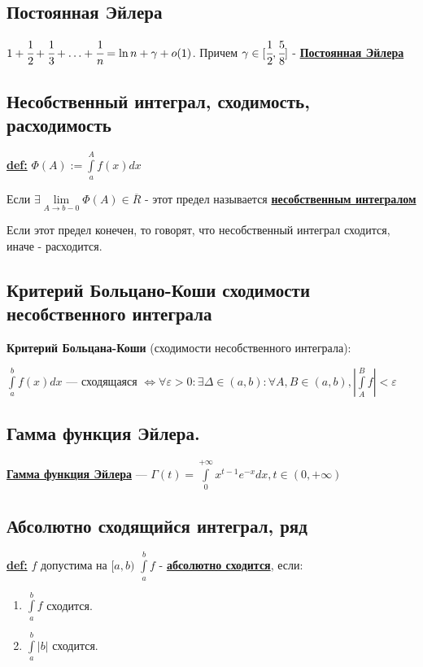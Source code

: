 \documentclass{article}
\newcommand{\integral}[2]{\displaystyle\int\limits_{#1}^{#2}}
\newcommand{\deff}[1]{\underline{\textbf{#1}}}
\begin{document}
\subsection{Постоянная Эйлера}

$1+\cfrac{1}{2}+\cfrac{1}{3}+\ldots +\cfrac{1}{n}= \ln n + \gamma + o(1)$. Причем $\gamma \in [\cfrac{1}{2},\cfrac{5}{8}]$ - \deff{Постоянная Эйлера}

\subsection{Несобственный интеграл, сходимость, расходимость}

\deff{def:} $\varPhi(A):= \integral{a}{A}f(x) dx$

Если $\exists \lim\limits_{A \rightarrow b -0} \varPhi(A) \in \overline{R}$ - этот предел называется \deff{несобственным интегралом}

Если этот предел конечен, то говорят, что несобственный интеграл сходится, иначе - расходится.

\subsection{Критерий Больцано-Коши сходимости несобственного интеграла}

\textbf{Критерий Больцана-Коши} (сходимости несобственного интеграла):
  
  $\integral{a}{b}f(x)dx$ --- сходящаяся $\Leftrightarrow \forall \varepsilon >0:\exists \Delta \in (a,b): \forall A,B\in (a,b),  |\integral{A}{B}f|< \varepsilon$
  
\subsection{Гамма функция Эйлера.}

\deff{Гамма функция Эйлера} --- $\Gamma(t) = \integral{0}{+\infty}x^{t-1}e^{-x} dx, t \in (0,+\infty)$

\subsection{Абсолютно сходящийся интеграл, ряд}

\deff{def:} $f$ допустима на $[a,b)$
$\integral{a}{b}f$ - \deff{абсолютно сходится}, если:
\begin{enumerate}
    \item $\integral{a}{b}f$ сходится.
    \item $\integral{a}{b} |b|$ сходится.
\end{enumerate}
\end{document}
